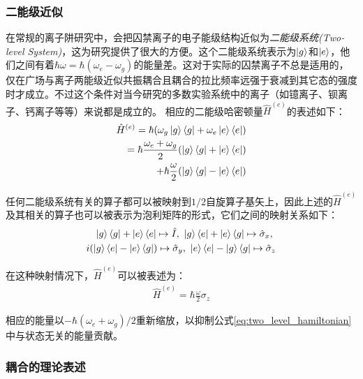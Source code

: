 \subsubsection[二能级近似]{二能级近似\label{section:two_level_approximation}}
在常规的离子阱研究中，会把囚禁离子的电子能级结构近似为\emph{二能级系统(Two-level System)}，这为研究提供了很大的方便。这个二能级系统表示为$\ket{g}$和$\ket{e}$，他们之间有着$\hbar \omega=\hbar(\omega_e-\omega_g)$的能量差。这对于实际的囚禁离子不总是适用的，仅在广场与离子两能级近似共振耦合且耦合的拉比频率远强于衰减到其它态的强度时才成立。不过这个条件对当今研究的多数实验系统中的离子（如镱离子、钡离子、钙离子等等）来说都是成立的。
相应的二能级哈密顿量$\hat{H}^{(e)}$的表述如下：
\begin{align}
    \hat{H}^{(e)}=\hbar(\omega_g\ket{g}\bra{g}+\omega_e\ket{e}\bra{e})\\
    =\hbar\frac{\omega_e+\omega_g}{2}(\ket{g}\bra{g}+\ket{e}\bra{e})\\
    +\hbar\frac{\omega}{2}(\ket{g}\bra{g}-\ket{e}\bra{e}) \label{eq:two_level_hamiltonian}
\end{align}

任何二能级系统有关的算子都可以被映射到$1/2$自旋算子基矢上，因此上述的$\hat{H}^{(e)}$及其相关的算子也可以被表示为泡利矩阵的形式，它们之间的映射关系如下：
\begin{align}
    \ket{g}\bra{g}+\ket{e}\bra{e}\mapsto \hat{I},\ \ket{g}\bra{e}+\ket{e}\bra{g}\mapsto \hat{\sigma}_x,\ \\
    i(\ket{g}\bra{e}-\ket{e}\bra{g})\mapsto \hat{\sigma}_y,\ \ket{e}\bra{e}-\ket{g}\bra{g}\mapsto \hat{\sigma}_z
\end{align}

在这种映射情况下，$\hat{H}^{(e)}$可以被表述为：
\begin{align}
    \hat{H}^{(e)}=\hbar\frac{\omega}{2}\sigma_z
\end{align}

相应的能量以$-\hbar(\omega_e+\omega_g)/2$重新缩放，以抑制公式\eqref{eq:two_level_hamiltonian}中与状态无关的能量贡献。

\subsubsection[耦合的理论表述]{耦合的理论表述\label{section:coupling_theory}}


